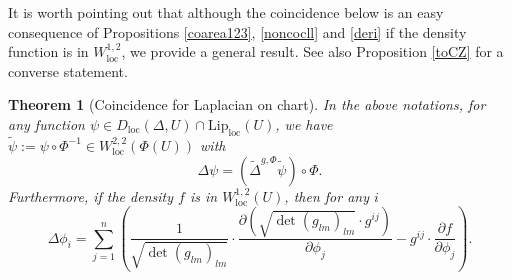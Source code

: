 \documentclass[11pt,reqno]{amsart}
\newtheorem{theorem}{Theorem}[section]
\theoremstyle{definition}
\numberwithin{equation}{section}
\DeclareMathOperator{\loc}{loc}
\begin{document}
It is worth pointing out that although the coincidence below is an easy consequence of Propositions \ref{coarea123}, \ref{noncocll} and \ref{deri} if the density function is in $W^{1,2}_{\loc}$, we provide a general result. See also Proposition \ref{toCZ} for a converse statement.

\begin{theorem}[Coincidence for Laplacian on chart]\label{asnasi}  
In the above notations, for any function $\psi\in D_{\loc}(\Delta, U)\cap \mathrm{Lip}_{\loc}(U)$,
we have $\tilde \psi:=\psi \circ \Phi^{-1} \in W^{2,2}_{\loc}(\Phi(U))$ with 
\begin{equation}\label{asnasirhas}
    \Delta \psi= (\tilde \Delta^{g, \Phi}\tilde \psi) \circ \Phi.
\end{equation}
Furthermore, if the density $f$ is in $W^{1,2}_{\loc}(U)$, then for any $i$
\begin{equation}\label{asahsjaoisjfaisjiajsijas}
    \Delta \phi_i=\sum_{j=1}^n\left(\frac{1}{\sqrt{\det (g_{lm})_{lm}}} \cdot \frac{\partial (\sqrt{\det (g_{lm})_{lm}} \cdot g^{ij})}{\partial \phi_j} - g^{ij}\cdot \frac{\partial f}{\partial \phi_j}\right).
\end{equation}
\end{theorem}
\end{document}
